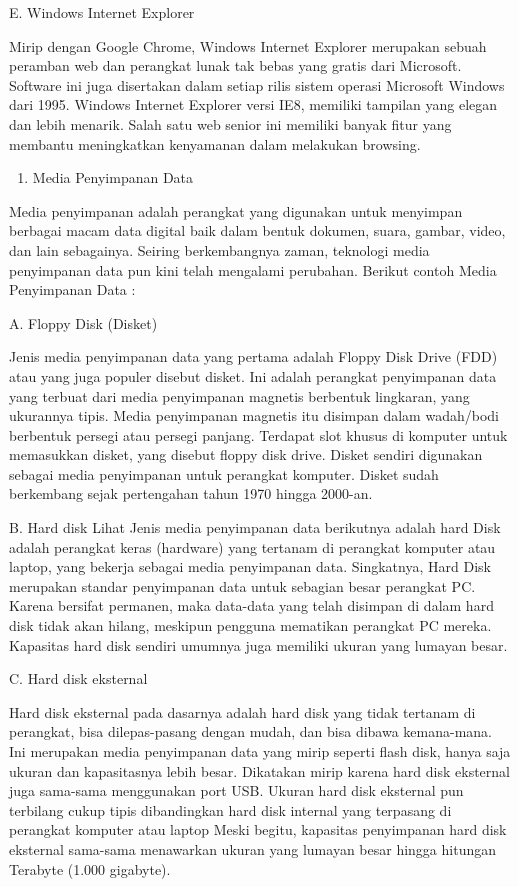 \documentclass[11pt]{article}
\begin{document}
E. Windows Internet Explorer

Mirip dengan Google Chrome, Windows Internet Explorer merupakan
sebuah peramban web dan perangkat lunak tak bebas yang gratis dari
Microsoft. Software ini juga disertakan dalam setiap rilis sistem operasi
Microsoft Windows dari 1995.
Windows Internet Explorer versi IE8, memiliki tampilan yang elegan dan
lebih menarik. Salah satu web senior ini memiliki banyak fitur yang
membantu meningkatkan kenyamanan dalam melakukan browsing.

\begin{enumerate}
\item Media Penyimpanan Data
\end{enumerate}

Media penyimpanan adalah perangkat yang digunakan untuk menyimpan
berbagai macam data digital baik dalam bentuk dokumen, suara, gambar,
video, dan lain sebagainya. Seiring berkembangnya zaman, teknologi media
penyimpanan data pun kini telah mengalami perubahan. Berikut contoh
Media Penyimpanan Data :








A. Floppy Disk (Disket)

Jenis media penyimpanan data yang pertama adalah Floppy Disk Drive
(FDD) atau yang juga populer disebut disket. Ini adalah perangkat
penyimpanan data yang terbuat dari media penyimpanan magnetis
berbentuk lingkaran, yang ukurannya tipis. Media penyimpanan
magnetis itu disimpan dalam wadah/bodi berbentuk persegi atau persegi
panjang. Terdapat slot khusus di komputer untuk memasukkan disket,
yang disebut floppy disk drive. Disket sendiri digunakan sebagai media
penyimpanan untuk perangkat komputer. Disket sudah berkembang
sejak pertengahan tahun 1970 hingga 2000-an.

B. Hard disk Lihat
Jenis media penyimpanan data berikutnya adalah hard Disk adalah
perangkat keras (hardware) yang tertanam di perangkat komputer atau
laptop, yang bekerja sebagai media penyimpanan data. Singkatnya, Hard
Disk merupakan standar penyimpanan data untuk sebagian besar
perangkat PC. Karena bersifat permanen, maka data-data yang telah
disimpan di dalam hard disk tidak akan hilang, meskipun pengguna
mematikan perangkat PC mereka. Kapasitas hard disk sendiri umumnya
juga memiliki ukuran yang lumayan besar.

C. Hard disk eksternal

Hard disk eksternal pada dasarnya adalah hard disk yang tidak tertanam
di perangkat, bisa dilepas-pasang dengan mudah, dan bisa dibawa
kemana-mana. Ini merupakan media penyimpanan data yang mirip
seperti flash disk, hanya saja ukuran dan kapasitasnya lebih besar.
Dikatakan mirip karena hard disk eksternal juga sama-sama
menggunakan port USB. Ukuran hard disk eksternal pun terbilang cukup
tipis dibandingkan hard disk internal yang terpasang di perangkat
komputer atau laptop Meski begitu, kapasitas penyimpanan hard disk
eksternal sama-sama menawarkan ukuran yang lumayan besar hingga
hitungan Terabyte (1.000 gigabyte).
\end{document}
